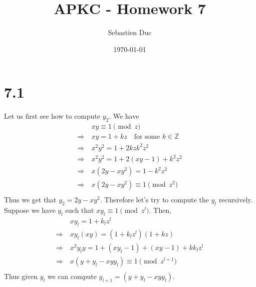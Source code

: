 \documentclass[12pt,a4paper]{article}
\title{APKC - Homework 7}
\author{Sebastien Duc}
\date{\today}
\newcommand {\thus}{\Rightarrow\:}
\begin{document}
\maketitle

\section*{7.1}
Let us first see how to compute $y_2$. We have 
\[
    \begin{split}
             & xy \equiv 1 \pmod z\\
       \thus & xy = 1 + kz \quad \mbox{for some $k\in\mathbb{Z}$}\\
       \thus & x^2 y^2 = 1 + 2kz k^2 z^2 \\
       \thus & x^2 y^2 = 1 + 2(xy - 1) + k^2 z^2 \\
       \thus & x(2y - xy^2) = 1 - k^2 z^2\\
       \thus & x(2y - xy^2) \equiv 1 \pmod{z^2}\\ 
    \end{split}
\]
Thus we get that $y_2 = 2y -xy^2$.
Therefore let's try to compute the $y_l$ recursively.
Suppose we have $y_l$ such that $xy_l \equiv 1 \pmod z^l$. Then,
\[
    \begin{split}
            & xy_l = 1 + k_l z^l\\
      \thus & xy_l (xy) = (1 + k_l z^l)(1 + kz)\\
      \thus & x^2 y_l y = 1 + (xy_l - 1) + (xy - 1) + k k_l z^l\\
      \thus & x(y + y_l -xyy_l) \equiv 1 \pmod{z^{l+1}}\\
    \end{split}
\]
Thus given $y_l$ we can compute $y_{l+1} = (y + y_l - xyy_l)$.
\end{document}
